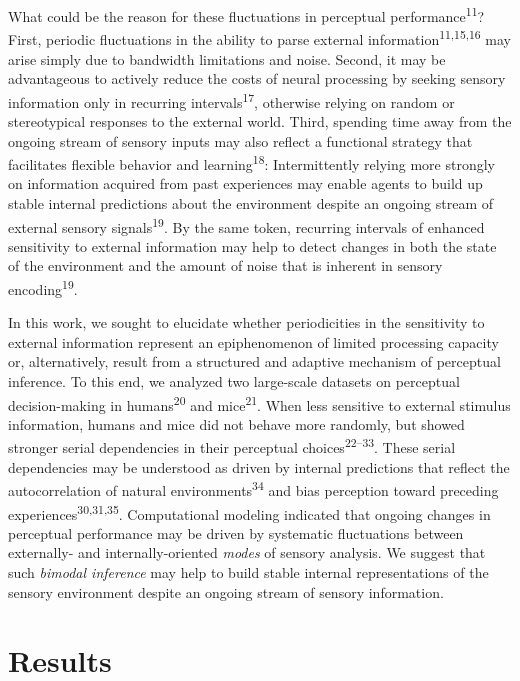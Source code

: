 \documentclass[
]{article}
\begin{document}
What could be the reason for these fluctuations in perceptual
performance\textsuperscript{11}? First, periodic fluctuations in the
ability to parse external information\textsuperscript{11,15,16} may
arise simply due to bandwidth limitations and noise. Second, it may be
advantageous to actively reduce the costs of neural processing by
seeking sensory information only in recurring
intervals\textsuperscript{17}, otherwise relying on random or
stereotypical responses to the external world. Third, spending time away
from the ongoing stream of sensory inputs may also reflect a functional
strategy that facilitates flexible behavior and
learning\textsuperscript{18}: Intermittently relying more strongly on
information acquired from past experiences may enable agents to build up
stable internal predictions about the environment despite an ongoing
stream of external sensory signals\textsuperscript{19}. By the same
token, recurring intervals of enhanced sensitivity to external
information may help to detect changes in both the state of the
environment and the amount of noise that is inherent in sensory
encoding\textsuperscript{19}.

In this work, we sought to elucidate whether periodicities in the
sensitivity to external information represent an epiphenomenon of
limited processing capacity or, alternatively, result from a structured
and adaptive mechanism of perceptual inference. To this end, we analyzed
two large-scale datasets on perceptual decision-making in
humans\textsuperscript{20} and mice\textsuperscript{21}. When less
sensitive to external stimulus information, humans and mice did not
behave more randomly, but showed stronger serial dependencies in their
perceptual choices\textsuperscript{22--33}. These serial dependencies
may be understood as driven by internal predictions that reflect the
autocorrelation of natural environments\textsuperscript{34} and bias
perception toward preceding experiences\textsuperscript{30,31,35}.
Computational modeling indicated that ongoing changes in perceptual
performance may be driven by systematic fluctuations between externally-
and internally-oriented \emph{modes} of sensory analysis. We suggest
that such \emph{bimodal inference} may help to build stable internal
representations of the sensory environment despite an ongoing stream of
sensory information.

\hypertarget{results}{%
\section{Results}\label{results}}
\end{document}

